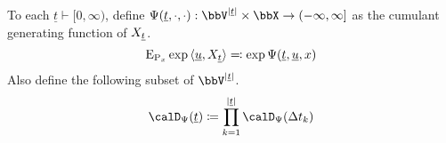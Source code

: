 \begin{definition}
  \label{definition:aff-fdds}
  To each $\underline t \vdash [0,\infty)$, define $\aff(\underline t, \cdot, \cdot): \vecSpace^{|\underline t|} \times \stateSpace \rightarrow (-\infty,\infty]$ as the cumulant generating function of $X_{\underline t}$.
  \begin{equation*}
    {\operatorname{E}}_{{\operatorname{P}}_x} \exp{\langle \underline{u}, X_{\underline t} \rangle} \eqqcolon \exp\Psi(\underline t, \underline{u}, x)
  \end{equation*}
  Also define the following subset of $\vecSpace^{|\underline t|}$.
  \begin{equation*}
    \momentSpace(\underline t) \defeq \prod_{k=1}^{|\underline t|} \momentSpace(\Delta t_k)
  \end{equation*}
\end{definition}
